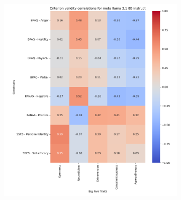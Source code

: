 \documentclass{article}
\begin{document}
\begin{figure}[H]
\begin{subfigure}{0.38\textwidth}
        \includegraphics[width=\linewidth]{../Prompt_code/plots/meta-llama-3.1-8B-instruct/crit_val_correlation.png}
    \end{subfigure}
\end{figure}
\end{document}
